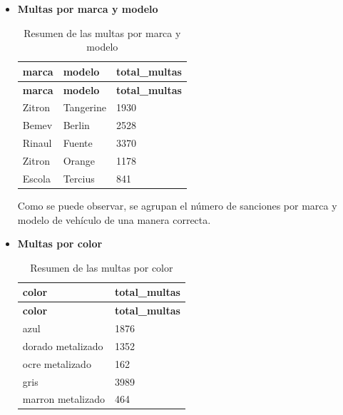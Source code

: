 \documentclass[]{article}
\begin{document}
\begin{itemize}
    \item \textbf{Multas por marca y modelo}

\begin{table}[H]
\begin{longtable}{l l l}
    \hline
    \textbf{marca} & \textbf{modelo} & \textbf{total\_multas} \\ \hline
    \endfirsthead
    
    \hline
    \textbf{marca} & \textbf{modelo} & \textbf{total\_multas} \\ \hline
    \endhead
    
    Zitron & Tangerine & 1930 \\ \hline
    Bemev & Berlin & 2528 \\ \hline
    Rinaul & Fuente & 3370 \\ \hline
    Zitron & Orange & 1178 \\ \hline
    Escola & Tercius & 841 \\ \hline
    
\end{longtable}
\caption{Resumen de las multas por marca y modelo}
\end{table}

Como se puede observar, se agrupan el número de sanciones por marca y modelo de vehículo de una manera correcta.

    \item \textbf{Multas por color}

\begin{table}[H]
\begin{longtable}{l l}
    \hline
    \textbf{color} & \textbf{total\_multas} \\ \hline
    \endfirsthead
    
    \hline
    \textbf{color} & \textbf{total\_multas} \\ \hline
    \endhead
    
    azul & 1876 \\ \hline
    dorado metalizado & 1352 \\ \hline
    ocre metalizado & 162 \\ \hline
    gris & 3989 \\ \hline
    marron metalizado & 464 \\ \hline

\end{longtable}
\caption{Resumen de las multas por color}
\end{table}


\end{itemize}
\end{document}

